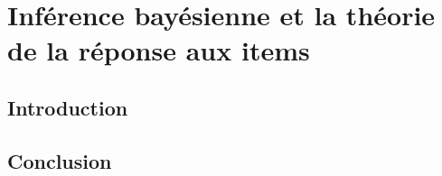 \chapter{Inférence bayésienne et la théorie de la réponse aux items}
\minitoc
\thispagestyle{empty}
\newpage

\section{Introduction}

\section{Conclusion}

